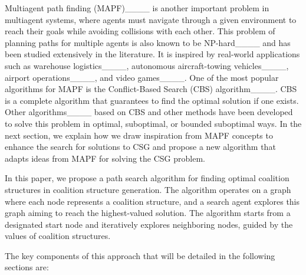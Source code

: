 
Multiagent path finding (MAPF)____ is another important problem in multiagent systems, where agents must navigate through a given environment to reach their goals while avoiding collisions with each other. This problem of planning paths for multiple agents is also known to be NP-hard____ and has been studied extensively in the literature. It is inspired by real-world applications such as warehouse
logistics____, autonomous aircraft-towing vehicles____, airport operations____, and video games____. 
One of the most popular algorithms for MAPF is the Conflict-Based Search (CBS) algorithm____. CBS is a complete algorithm that guarantees to find the optimal solution if one exists. Other algorithms____ based on CBS and other methods have been developed to solve this problem in optimal, suboptimal, or bounded suboptimal ways. 
In the next section, we explain how we draw inspiration from MAPF concepts to enhance the search for solutions to CSG and propose a new algorithm that adapts ideas from MAPF for solving the CSG problem.

In this paper, we propose a path search algorithm for finding optimal coalition structures in coalition structure generation. The algorithm operates on a graph where each node represents a coalition structure, and a search agent explores this graph aiming to reach the highest-valued solution. The algorithm starts from a designated start node and iteratively explores neighboring nodes, guided by the values of coalition structures.

The key components of this approach that will be detailed in the following sections are:

